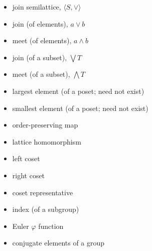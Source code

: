 \documentclass[12pt]{article}
\newcommand{\boldemph}[1]{#1}
\newcommand\<{\ensuremath{\langle}}
\renewcommand\>{\ensuremath{\rangle}}
\newcommand\meet{\ensuremath{\wedge}}
\newcommand\join{\ensuremath{\vee}}
\begin{document}
\begin{itemize}
\item \boldemph{join semilattice}, $\<S, \join\>$
\item \boldemph{join} (of elements), $a\join b$
\item \boldemph{meet} (of elements), $a\meet b$
\item \boldemph{join} (of a subset), $\bigvee T$
\item \boldemph{meet} (of a subset), $\bigwedge T$
\item \boldemph{largest element} (of a poset; need not exist)
\item \boldemph{smallest element} (of a poset; need not exist)
\item order-preserving map
\item lattice homomorphism
\item \boldemph{left coset}
\item \boldemph{right coset}
\item \boldemph{coset representative}
\item \boldemph{index} (of a subgroup)
\item \boldemph{Euler} $\varphi$ \boldemph{function}
\item \boldemph{conjugate} elements of a group
\end{itemize}
\end{document}

